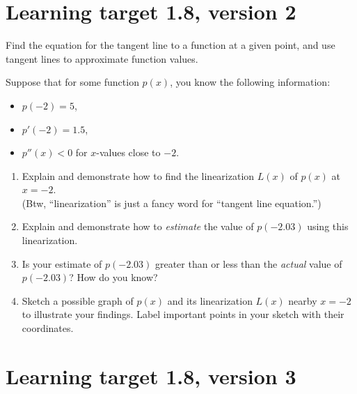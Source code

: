 



\section{Learning target 1.8, version 2}

Find the equation for the tangent line to a function at a given point, and use tangent lines to approximate function values.

\hrulefill

Suppose that for some function \(p(x)\), you know the following information:
\begin{itemize}
    \item \(p(-2) = 5\),
    \item \(p'(-2) = 1.5\), 
    \item \(p''(x) < 0\) for \(x\)-values close to \(-2\). 
\end{itemize}

\begin{enumerate}[leftmargin=0pt]
    \item Explain and demonstrate how to find the linearization \(L(x)\) of \(p(x)\) at \(x =-2\). \\
	(Btw, ``linearization'' is just a fancy word for ``tangent line equation.'')
    \vfill
    \item Explain and demonstrate how to \textit{estimate} the value of \(p(-2.03)\) using this linearization. 
    
    \vfill
    \item Is your estimate of \(p(-2.03)\) greater than or less than the \textit{actual} value of \(p(-2.03)\)? How do you know?
    
    \vfill
    \item Sketch a possible graph of \(p(x)\) and its linearization \(L(x)\) nearby \(x =-2\) to illustrate your findings. Label important points in your sketch with their coordinates.
    
    \vfill
\end{enumerate}

\pagebreak

\section{Learning target 1.8, version 3}

